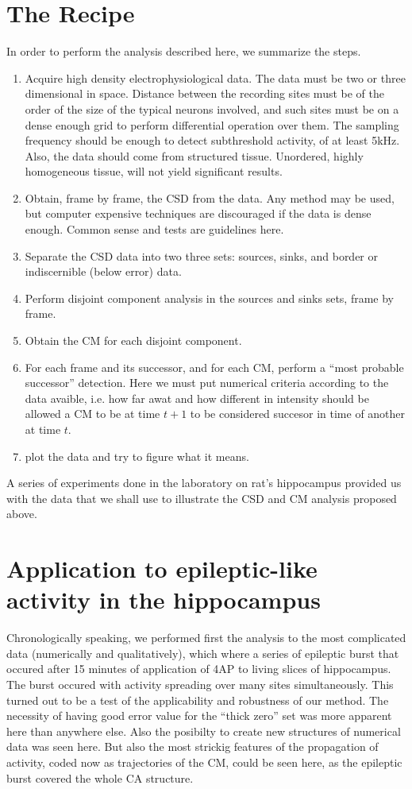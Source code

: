 \documentclass{article}
\begin{document}
\section{The Recipe}

In order to perform the analysis described here, we summarize the steps.
\begin{enumerate}
\item Acquire high density electrophysiological data. The data must be two or three dimensional in space. Distance between the recording sites must be of the order of the size of the typical neurons involved, and such sites must be on a dense enough grid to perform differential operation over them. The sampling frequency should be enough to detect subthreshold activity, of at least 5kHz. Also, the data should come from structured tissue. Unordered, highly homogeneous tissue, will not yield significant results. 
\item Obtain, frame by frame, the CSD from the data. Any method may be used, but computer expensive techniques are discouraged if the data is dense enough. Common sense and tests are guidelines here.
\item Separate the CSD data into two three sets: sources, sinks, and border or indiscernible (below error) data.
\item Perform disjoint component analysis in the sources and sinks sets, frame by frame.
\item  Obtain the CM for each disjoint component.
\item For each frame and its successor, and for each CM, perform a ``most probable successor'' detection. Here we must put numerical criteria according to the data avaible, i.e. how far awat and how different in intensity should be allowed a CM to be at time $t+1$ to be considered succesor in time of another at time $t$.
  \item plot the data and try to figure what it means.
\end{enumerate}

A series of experiments done in the laboratory on rat's hippocampus provided us with the data that we shall use to illustrate the CSD and CM analysis proposed above. 

\section{Application to epileptic-like activity in the hippocampus}
Chronologically speaking, we performed first the analysis to the most complicated data (numerically and qualitatively), which where a series of epileptic burst that occured after 15 minutes of application of 4AP to living slices of hippocampus. The burst occured with activity spreading over many sites simultaneously. This turned out to be a test of the applicability and robustness of our method. The necessity of having good error value for the ``thick zero'' set was more apparent here than anywhere else. Also the posibilty to create new structures of numerical data was seen here.  But also the most strickig features of the propagation of activity, coded now as trajectories of the CM, could be seen here, as the epileptic burst covered the whole CA structure. 
\end{document}

